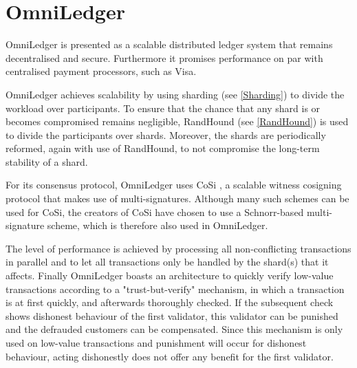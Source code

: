 \section{OmniLedger}
OmniLedger \cite{OmniLedger} is presented as a scalable distributed ledger system that remains decentralised and secure. Furthermore it promises performance on par with centralised payment processors, such as Visa.

OmniLedger achieves scalability by using sharding (see \ref{Sharding}) to divide the workload over participants. To ensure that the chance that any shard is or becomes compromised remains negligible, RandHound (see \ref{RandHound}) is used to divide the participants over shards. Moreover, the shards are periodically reformed, again with use of RandHound, to not compromise the long-term stability of a shard.

For its consensus protocol, OmniLedger uses CoSi \cite{CoSi}, a scalable witness cosigning protocol that makes use of multi-signatures. Although many such schemes can be used for CoSi, the creators of CoSi have chosen to use a Schnorr-based multi-signature scheme, which is therefore also used in OmniLedger.

The level of performance is achieved by processing all non-conflicting transactions in parallel and to let all transactions only be handled by the shard(s) that it affects.
Finally OmniLedger boasts an architecture to quickly verify low-value transactions according to a "trust-but-verify" mechanism, in which a transaction is at first quickly, and afterwards thoroughly checked. If the subsequent check shows dishonest behaviour of the first validator, this validator can be punished and the defrauded customers can be compensated. Since this mechanism is only used on low-value transactions and punishment will occur for dishonest behaviour, acting dishonestly does not offer any benefit for the first validator.